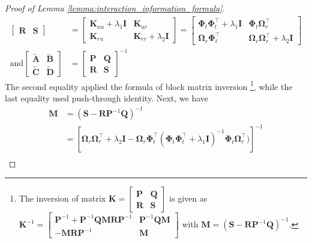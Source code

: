 \begin{proof}[Proof of Lemma \ref{lemma:interaction_information_formula}]
\begin{align}
\begin{bmatrix}
            \mathbf{R} & \mathbf{S}
            \end{bmatrix} & = \begin{bmatrix}
            \mathbf{K}_{uu} + \lambda_1\mathbf{I} & \mathbf{K}_{ur}  \\
            \mathbf{K}_{ru}  & \mathbf{K}_{rr} + \lambda_2\mathbf{I}
            \end{bmatrix} = \begin{bmatrix}
            \boldsymbol{\Phi}_t\boldsymbol{\Phi}_t^\top + \lambda_1\mathbf{I} & \boldsymbol{\Phi}_t \boldsymbol{\Omega}_r^\top \\
            \boldsymbol{\Omega}_r\boldsymbol{\Phi}_t^\top & \boldsymbol{\Omega}_r\boldsymbol{\Omega}_r^\top + \lambda_2 \mathbf{I}\end{bmatrix} \\
            \text{and} \begin{bmatrix}
    \widetilde{\mathbf{A}} & \widetilde{\mathbf{B}} \\
    \widetilde{\mathbf{C}} & \widetilde{\mathbf{D}} 
        \end{bmatrix} &=\begin{bmatrix}
            \mathbf{P} & \mathbf{Q} \\
            \mathbf{R} & \mathbf{S}
            \end{bmatrix} ^{-1}
    \end{align}
    The second equality applied the formula of block matrix inversion \footnote{The inversion of matrix $\mathbf{K} = \begin{bmatrix}
        \mathbf{P} & \mathbf{Q} \\ \mathbf{R} & \mathbf{S} 
    \end{bmatrix}$ is given as $\mathbf{K}^{-1} = \begin{bmatrix}
        \mathbf{P}^{-1} + \mathbf{P}^{-1} \mathbf{QMR}\mathbf{P}^{-1} & \mathbf{P}^{-1}\mathbf{QM} \\ -\mathbf{MR}\mathbf{P}^{-1} & \mathbf{M} 
    \end{bmatrix}$ with $\mathbf{M} = (\mathbf{S} - \mathbf{R}\mathbf{P}^{-1}\mathbf{Q})^{-1}$.}, 
    while the last equality used push-through identity. Next, we have
    \begin{align}
            \mathbf{M} &= (\mathbf{S} - \mathbf{R}\mathbf{P}^{-1}\mathbf{Q})^{-1} \\
            &= \left[\boldsymbol{\Omega}_r \boldsymbol{\Omega}_r^\top  + \lambda_2\mathbf{I} - \boldsymbol{\Omega}_r \boldsymbol{\Phi}_t^\top (\boldsymbol{\Phi}_t \boldsymbol{\Phi}_t ^\top+ \lambda_1\mathbf{I})^{-1} \boldsymbol{\Phi}_t \boldsymbol{\Omega}_r^\top)\right]^{-1} \\

\end{align}
\end{proof}
